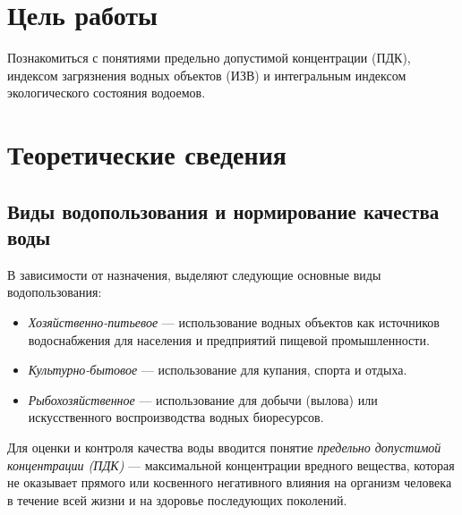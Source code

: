 \section*{Цель работы}

Познакомиться с понятиями предельно допустимой концентрации (ПДК), индексом загрязнения водных объектов (ИЗВ) и интегральным индексом экологического состояния водоемов.




\section*{Теоретические сведения}
\subsection*{Виды водопользования и нормирование качества воды}

В зависимости от назначения, выделяют следующие основные виды водопользования:
\begin{itemize}
    \item \textit{Хозяйственно-питьевое} — использование водных объектов как источников водоснабжения для населения и предприятий пищевой промышленности.
    \item \textit{Культурно-бытовое} — использование для купания, спорта и отдыха.
    \item \textit{Рыбохозяйственное} — использование для добычи (вылова) или искусственного воспроизводства водных биоресурсов.
\end{itemize}

Для оценки и контроля качества воды вводится понятие \textit{предельно допустимой концентрации (ПДК)} — максимальной концентрации вредного вещества, которая не оказывает прямого или косвенного негативного влияния на организм человека в течение всей жизни и на здоровье последующих поколений.

